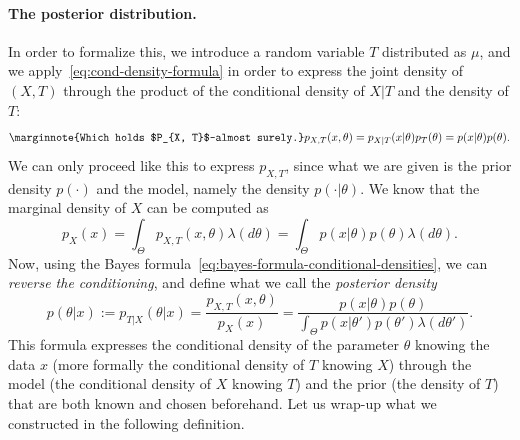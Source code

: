 \documentclass[
	fontsize=11pt, %
	twoside=false, %
	numbers=noenddot, %
]{kaobook}
\begin{document}
\paragraph{The posterior distribution.} %


In order to formalize this, we introduce a random variable $T$ distributed as $\mu$, and
we apply~\eqref{eq:cond-density-formula} in order to express the joint density of $(X, T)$ through the product of the conditional density of $X | T$ and the density of $T$:
\begin{equation}
	\label{eq:joint-as-conditional-distribution}
	\marginnote{Which holds $P_{X, T}$-almost surely.}
	p_{X, T}(x, \theta) = p_{X | T}(x | \theta) p_T(\theta) = p(x | \theta) p(\theta).
\end{equation}
We can only proceed like this to express $p_{X, T}$, since what we are given is the prior density $p(\cdot)$ and the model, namely the density $p(\cdot | \theta)$.
We know that the marginal density of $X$ can be computed as
\begin{equation*}
	p_X(x) = \int_\Theta p_{X, T}(x, \theta) \lambda(d \theta) 
	= \int_\Theta p(x | \theta) p(\theta) \lambda(d \theta).
\end{equation*}
Now, using the Bayes formula~\eqref{eq:bayes-formula-conditional-densities}, we can \emph{reverse the conditioning}, and define what we call the \emph{posterior density}
\begin{equation*}
	p(\theta | x) := p_{T | X}(\theta | x) = \frac{p_{X, T}(x, \theta)}{p_X(x)} 
	=  \frac{p(x | \theta) p(\theta)}{\int_\Theta p(x | \theta') p(\theta') \lambda(d \theta')}.
\end{equation*}
This formula expresses the conditional density of the parameter $\theta$ knowing the data $x$ (more formally the conditional density of $T$ knowing $X$) through the model (the conditional density of $X$ knowing $T$) and the prior (the density of $T$) that are both known and chosen beforehand.
Let us wrap-up what we constructed in the following definition.
\end{document}
